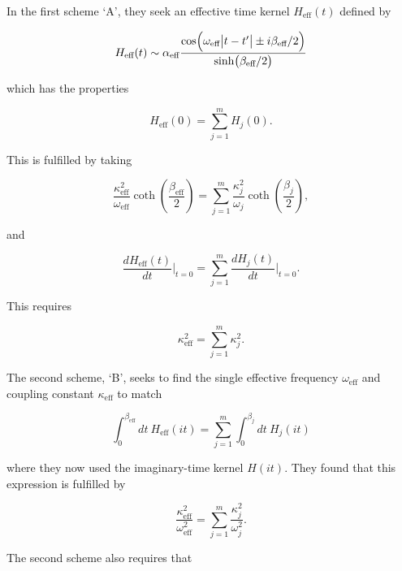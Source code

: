 In the first scheme `A', they seek an effective time kernel $H_{\text{eff}}(t)$ defined by

\begin{equation}
    H_{\text{eff}}(t) \sim \alpha_{\text{eff}} \frac{\cos(\omega_{\text{eff}}\abs{t - t'} \pm i\beta_{\text{eff}} / 2)}{\sinh(\beta_{\text{eff}} / 2)}
\end{equation}

which has the properties

\begin{equation} \label{eqn:hellwarth_scheme_s}
    H_{\text{eff}}(0) = \sum_{j=1}^m H_{j}(0).
\end{equation}

This is fulfilled by taking

\begin{equation}
    \frac{\kappa_{\text{eff}}^2}{\omega_{\text{eff}}} \coth(\frac{\beta_{\text{eff}}}{2}) = \sum_{j=1}^m \frac{\kappa_{j}^2}{\omega_{j}} \coth(\frac{\beta_{j}}{2}),
\end{equation}

and

\begin{equation}
    \frac{dH_{\text{eff}}(t)}{dt} \biggr\rvert_{t=0} = \sum_{j=1}^m \frac{dH_{j}(t)}{dt} \biggr\rvert_{t=0}.
\end{equation}

This requires

\begin{equation}
    \kappa_{\text{eff}}^2 = \sum_{j=1}^m \kappa_j^2.
\end{equation}

The second scheme, `B', seeks to find the single effective frequency $\omega_{\text{eff}}$ and coupling constant $\kappa_{\text{eff}}$ to match

\begin{equation}
    \int^{\beta_{\text{eff}}}_0 dt\ H_{\text{eff}}(it) = \sum_{j = 1}^m \int^{\beta_j}_0 dt\ H_j(it)
\end{equation}

where they now used the imaginary-time kernel $H(it)$. They found that this expression is fulfilled by

\begin{equation}
    \frac{\kappa_{\text{eff}}^2}{\omega_{\text{eff}}^2} = \sum_{j = 1}^m \frac{\kappa_{j}^2}{\omega_{j}^2}.
\end{equation}

The second scheme also requires that

